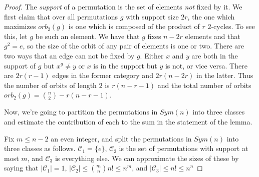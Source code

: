 \begin{proof}
	
	The \textit{support} of a permutation is the set of elements \textit{not} fixed by it.  We first claim that over all permutations $g$ with support size $2r$, the one which maximizes $orb_2(g)$ is one which is composed of the product of $r$ $2$-cycles.  To see this, let $g$ be such an element.  We have that $g$ fixes $n-2r$ elements and that $g^2=e$, so the size of the orbit of any pair of elements is one or two.  There are two ways that an edge can not be fixed by $g$.  Either $x$ and $y$ are both in the support of $g$ but $x^g\neq y$ or $x$ is in the support but $y$ is not, or vice versa.  There are $2r(r-1)$ edges in the former category and $2r(n-2r)$ in the latter.  Thus the number of orbits of length $2$ is $r(n-r-1)$ and the total number of orbits $orb_2(g)=\binom{n}{2}-r(n-r-1)$.
	
	Now, we're going to partition the permutations in $Sym(n)$ into three classes and estimate the contribution of each to the sum in the statement of the lemma.  
	
	Fix $m\leq n-2$ an even integer, and split the permutations in $Sym(n)$ into three classes as follows.   $\mathcal{C}_1=\{e\}$, $\mathcal{C}_2$ is the set of permutations with support at most $m$, and $\mathcal{C}_3$ is everything else.  We can approximate the sizes of these by saying that $|\mathcal{C}_1|=1$, $|\mathcal{C}_2|\leq \binom{m}{n}n!\leq n^m$, and $|\mathcal{C}_3|\leq n!\leq n^n$
	
	
\end{proof}


\ifdraft


\fi

